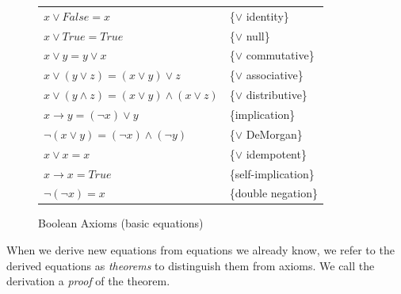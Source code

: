\begin{figure}
\begin{center}
\begin{tabular}{ll}
$x \vee False = x$                                   & \{$\vee$ identity\} \\
$x \vee True = True$                                 & \{$\vee$ null\} \\
$x \vee y = y \vee x$                                & \{$\vee$ commutative\} \\
$x \vee (y \vee z) = (x \vee y) \vee z$              & \{$\vee$ associative\} \\
$x \vee (y \wedge z) = (x \vee y) \wedge (x \vee z)$ & \{$\vee$ distributive\} \\
$x \rightarrow y = (\neg x) \vee y$                  & \{implication\} \\
$\neg(x \vee y) = (\neg x) \wedge (\neg y)$          & \{$\vee$ DeMorgan\} \\
$x \vee x = x$                                       & \{$\vee$ idempotent\} \\
$x \rightarrow x = True$                             & \{self-implication\} \\
$\neg(\neg x)  = x$                                  & \{double negation\} \\
\end{tabular}
\end{center}
\caption{Boolean Axioms (basic equations)}
\label{fig-02-03}
\end{figure}

When we derive new equations from equations we already know,
we refer to the derived equations as \emph{theorems} to
distinguish them from axioms.
We call the derivation a
\emph{proof} of the theorem.

